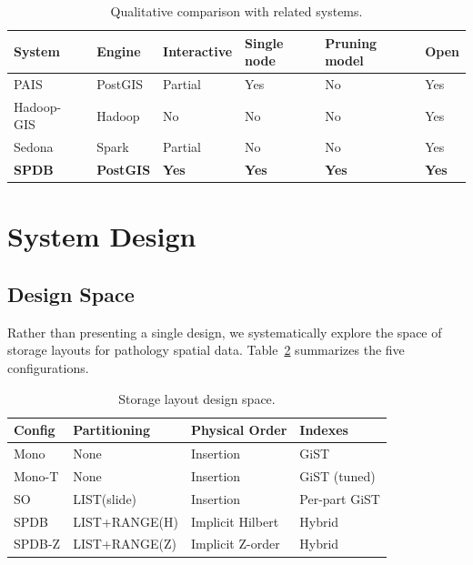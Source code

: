 \documentclass[10pt,twocolumn]{article}
\begin{document}
\begin{table}[t]
\centering
\caption{Qualitative comparison with related systems.}
\label{tab:comparison}
\scriptsize
\begin{tabular}{@{}p{1.4cm}p{1.1cm}p{0.8cm}p{0.7cm}p{0.7cm}p{0.7cm}@{}}
\toprule
\textbf{System} & \textbf{Engine} & \textbf{Inter\-active} & \textbf{Single node} & \textbf{Pruning model} & \textbf{Open} \\
\midrule
PAIS~\cite{wang2011pais} & PostGIS & Partial & Yes & No & Yes \\
Hadoop-GIS~\cite{aji2013hadoop} & Hadoop & No & No & No & Yes \\
Sedona~\cite{sedona2021} & Spark & Partial & No & No & Yes \\
\textbf{SPDB} & \textbf{PostGIS} & \textbf{Yes} & \textbf{Yes} & \textbf{Yes} & \textbf{Yes} \\
\bottomrule
\end{tabular}
\end{table}

\section{System Design}
\label{sec:design}

\subsection{Design Space}

Rather than presenting a single design, we systematically explore the space of storage layouts for pathology spatial data.
Table~\ref{tab:designspace} summarizes the five configurations.

\begin{table}[t]
\centering
\caption{Storage layout design space.}
\label{tab:designspace}
\scriptsize
\begin{tabular}{@{}llll@{}}
\toprule
\textbf{Config} & \textbf{Partitioning} & \textbf{Physical Order} & \textbf{Indexes} \\
\midrule
Mono & None & Insertion & GiST \\
Mono-T & None & Insertion & GiST (tuned) \\
SO & LIST(slide) & Insertion & Per-part GiST \\
SPDB & LIST+RANGE(H) & Implicit Hilbert & Hybrid \\
SPDB-Z & LIST+RANGE(Z) & Implicit Z-order & Hybrid \\
\bottomrule
\end{tabular}
\end{table}
\end{document}
